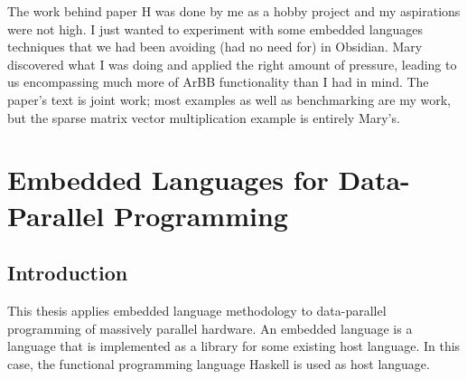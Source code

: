 \documentclass[a4paper]{book}
\newcommand{\thesistitle}{Embedded Languages for Data-Parallel Programming}
\begin{document}
The work behind paper H was done by me as a hobby project and my aspirations were not 
high. I just wanted to experiment with some embedded languages techniques that we had 
been avoiding (had no need for) in Obsidian. Mary discovered what I was doing and applied 
the right amount of pressure, leading to us encompassing much more of ArBB functionality than 
I had in mind. The paper's text is joint work; most examples as well as benchmarking are my work,
but the sparse matrix vector multiplication example is entirely Mary's. 



\tableofcontents


\cleardoublepage
\clearpage

\pagestyle{fancy}
\fancyfoot{}
\fancyhead[LO]{}
\fancyhead[RO]{\leftmark}
\renewcommand{\headrulewidth}{0.0pt}
\fancyhead[LE,RO]{\thepage}

%
%
\chapter{\thesistitle}


\section{Introduction} 

This thesis applies embedded language methodology to data-parallel programming of 
massively parallel hardware. An embedded language is a language that is implemented 
as a library for some existing host language. In this case, the functional programming 
language Haskell is used as host language. 
\end{document}
